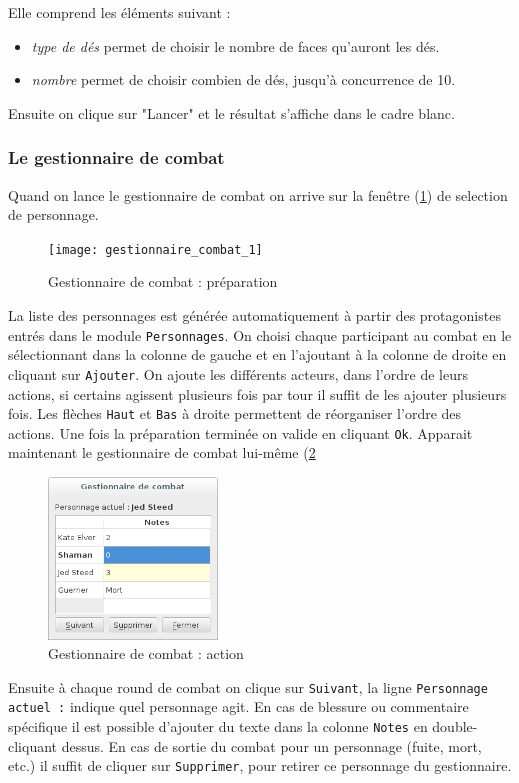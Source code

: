 \documentclass[a4paper,12pt]{article}
\newcommand*{\interfaceitem}[1]{\texttt{#1}}
\begin{document}
Elle comprend les éléments suivant :
\begin{itemize}
  \item  \emph{type de dés} permet de choisir le nombre de faces qu'auront les dés.
  \item \emph{nombre} permet de choisir combien de dés, jusqu'à concurrence de 10.
\end{itemize}
Ensuite on clique sur "Lancer" et le résultat s'affiche dans le cadre blanc.

\subsubsection{Le gestionnaire de combat}
Quand on lance le gestionnaire de combat on arrive sur la fenêtre (\ref{gestion_combat_choix}) de selection de personnage.
\begin{figure}[h]
    \texttt{[image: gestionnaire\_combat\_1]}
    \caption{Gestionnaire de combat : préparation}
    \label{gestion_combat_choix}
\end{figure}
La liste des personnages est générée automatiquement à partir des protagonistes entrés dans le module \interfaceitem{Personnages}.
On choisi chaque participant au combat en le sélectionnant dans la colonne de gauche et en l'ajoutant à la colonne de droite en cliquant sur \interfaceitem{Ajouter}.
On ajoute les différents acteurs, dans l’ordre de leurs actions, si certains
agissent plusieurs fois par tour il suffit de les ajouter plusieurs fois. Les flèches \interfaceitem{Haut} et \interfaceitem{Bas} à droite permettent de réorganiser l’ordre des actions.
Une fois la préparation terminée on valide en cliquant \interfaceitem{Ok}.
Apparait maintenant le gestionnaire de combat lui-même (\ref{gestion_combat_fight}
\begin{figure}[h]
    \includegraphics[width=0.4\textwidth]{gestion_combat_fight}
    \caption{Gestionnaire de combat : action}
    \label{gestion_combat_fight}
\end{figure}
Ensuite à chaque round de combat on clique sur \interfaceitem{Suivant}, la ligne \interfaceitem{Personnage actuel :} indique quel personnage agit. En cas de blessure ou commentaire spécifique il est possible d'ajouter du texte dans la colonne \interfaceitem{Notes} en double-cliquant dessus.
En cas de sortie du combat pour un personnage (fuite, mort, etc.) il suffit de cliquer sur \interfaceitem{Supprimer}, pour retirer ce personnage du gestionnaire.
\end{document}
